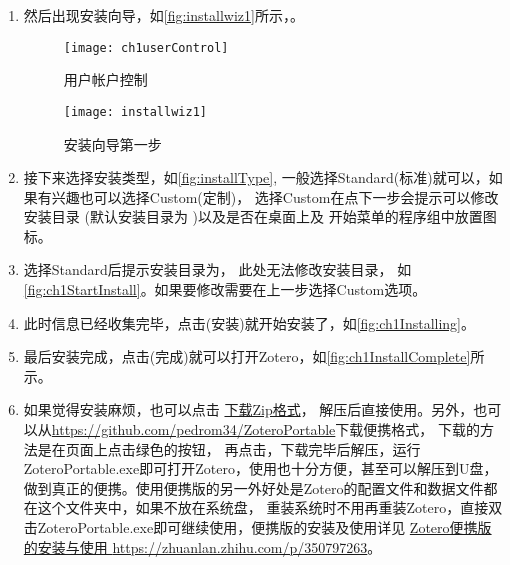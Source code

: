 \documentclass[cn,11pt,chinese]{elegantbook}
\begin{document}
\begin{enumerate}
				\item 然后出现安装向导，如\autoref{fig:installwiz1}所示，。
					\begin{figure}[htbp]
						\centering
						\begin{minipage}[t]{\dimexpr0.5\textwidth-4em}
							\centering
							\texttt{[image: ch1userControl]}
							\caption{用户帐户控制}
							\label{fig:userControl}
						\end{minipage}
						\hspace{1em}		
						\begin{minipage}[t]{\dimexpr0.5\textwidth-4em}
							\centering
							\texttt{[image: installwiz1]}
							\caption{安装向导第一步}
							\label{fig:installwiz1}
						\end{minipage}
					\end{figure}
				\item 接下来选择安装类型，如\autoref{fig:installType},
				一般选择Standard(标准)就可以，如果有兴趣也可以选择Custom(定制)，
				选择Custom在点下一步会提示可以修改安装目录
				(默认安装目录为 )以及是否在桌面上及
				开始菜单的程序组中放置图标。
				\item 选择Standard后提示安装目录为，
				此处无法修改安装目录，
				如\autoref{fig:ch1StartInstall}。如果要修改需要在上一步选择Custom选项。
				\item 此时信息已经收集完毕，点击(安装)就开始安装了，如\autoref{fig:ch1Installing}。
				\item 最后安装完成，点击(完成)就可以打开Zotero，如\autoref{fig:ch1InstallComplete}所示。
				\item 如果觉得安装麻烦，也可以点击
				\href{https://www.zotero.org/download/client/dl?channel=release&platform=win32-zip}{下载Zip格式}，
				解压后直接使用。另外，也可以从\href{https://github.com/pedrom34/ZoteroPortable}
				{https://github.com/pedrom34/ZoteroPortable}下载便携格式，
				下载的方法是在页面上点击绿色的按钮，
				再点击，下载完毕后解压，运行ZoteroPortable.exe即可打开Zotero，使用也十分方便，甚至可以解压到U盘，
				做到真正的便携。使用便携版的另一外好处是Zotero的配置文件和数据文件都在这个文件夹中，如果不放在系统盘，
				重装系统时不用再重装Zotero，直接双击ZoteroPortable.exe即可继续使用，便携版的安装及使用详见
				\href{https://zhuanlan.zhihu.com/p/350797263}{Zotero便携版的安装与使用
				\url{https://zhuanlan.zhihu.com/p/350797263}}。


		\end{enumerate}
			
\end{document}
